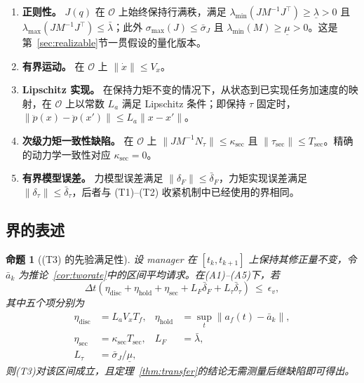 \documentclass[journal]{IEEEtran}
\newtheorem{proposition}{命题}
\begin{document}
\begin{enumerate}
\item[(A1)] \textbf{正则性。} $J(q)$ 在 $\mathcal O$ 上始终保持行满秩，满足 $\lambda_{\min}(JM^{-1}J^\top)\ge\underline\lambda>0$ 且 $\lambda_{\max}(JM^{-1}J^\top)\le\bar\lambda$；此外 $\sigma_{\max}(J)\le\bar\sigma_J$ 且 $\lambda_{\min}(M)\ge\underline\mu>0$。这是第~\ref{sec:realizable}节一贯假设的量化版本。
\item[(A2)] \textbf{有界运动。} 在 $\mathcal O$ 上 $\|\dot x\|\le V_x$。
\item[(A3)] \textbf{Lipschitz 实现。} 在保持力矩不变的情况下，从状态到已实现任务加速度的映射，在 $\mathcal O$ 上以常数 $L_a$ 满足 Lipschitz 条件；即保持 $\tau$ 固定时，$\|\ddot p(x)-\ddot p(x')\|\le L_a\|x-x'\|$。
\item[(A4)] \textbf{次级力矩一致性缺陷。} 在 $\mathcal O$ 上 $\|JM^{-1}N_\tau\|\le\kappa_{\mathrm{sec}}$ 且 $\|\tau_{\mathrm{sec}}\|\le T_{\mathrm{sec}}$。精确的动力学一致性对应 $\kappa_{\mathrm{sec}}=0$。
\item[(A5)] \textbf{有界模型误差。} 力模型误差满足 $\|\delta_F\|\le\bar\delta_F$，力矩实现误差满足 $\|\delta_\tau\|\le\bar\delta_\tau$，后者与 (T1)--(T2) 收紧机制中已经使用的界相同。
\end{enumerate}

\subsection{界的表述}

\begin{proposition}[(T3) 的先验满足性]
\label{prop:t3}
设 manager 在 $[t_k,t_{k+1}]$ 上保持其修正量不变，令 $\bar a_k$ 为推论~\ref{cor:tworate}中的区间平均请求。在\textnormal{(A1)--(A5)}下，若
\begin{equation}
\Delta t\left(\eta_{\mathrm{disc}}+\eta_{\mathrm{hold}}
+\eta_{\mathrm{sec}}+L_F\bar\delta_F+L_\tau\bar\delta_\tau\right)
\ \le\ \epsilon_v ,
\label{eq:t3bound}
\end{equation}
其中五个项分别为
\begin{align}
\eta_{\mathrm{disc}}&=L_aV_xT_f, &
\eta_{\mathrm{hold}}&=\sup_{t}\|a_f(t)-\bar a_k\|, \nonumber\\
\eta_{\mathrm{sec}}&=\kappa_{\mathrm{sec}}T_{\mathrm{sec}}, &
L_F&=\bar\lambda, \nonumber\\
L_\tau&=\bar\sigma_J/\underline\mu, & &
\label{eq:t3terms}
\end{align}
则\textnormal{(T3)}对该区间成立，且定理~\ref{thm:transfer}的结论无需测量后继缺陷即可得出。
\end{proposition}
\end{document}
